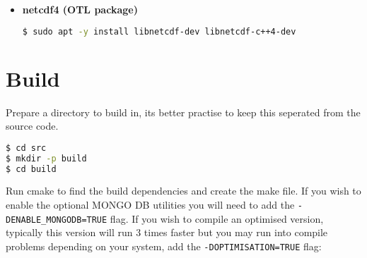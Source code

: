 \begin{itemize}
\begin{lstlisting}[language=bash]
$ cd mongo-c-driver-1.17.1/
$ mkdir cmakebuild
$ cd cmakebuild/
$ cmake -DENABLE_AUTOMATIC_INIT_AND_CLEANUP=OFF ..
$ cmake --build .
$ sudo cmake --build . --target install

$ cd ../../
$ curl -OL https://github.com/mongodb/mongo-cxx-driver/releases/download/r3.6.0/mongo-cxx-driver-r3.6.0.tar.gz
$ tar -xzf mongo-cxx-driver-r3.6.0.tar.gz

$ cd mongo-cxx-driver-r3.6.0/

$ cd build/
$ cmake -DCMAKE_BUILD_TYPE=Release -DCMAKE_INSTALL_PREFIX=/usr/local ..
$ sudo cmake --build . --target EP_mnmlstc_core
$ cmake --build .
$ sudo cmake --build . --target install

$ wget -qO - https://www.mongodb.org/static/pgp/server-4.4.asc | sudo apt-key add -
$ echo "deb [ arch=amd64,arm64 ] https://repo.mongodb.org/apt/ubuntu focal/mongodb-org/4.4 multiverse" | sudo tee /etc/apt/sources.list.d/mongodb-org-4.4.list
$ echo "deb [ arch=amd64,arm64 ] https://repo.mongodb.org/apt/ubuntu bionic/mongodb-org/4.4 multiverse" | sudo tee /etc/apt/sources.list.d/mongodb-org-4.4.list

$ sudo apt update
$ sudo apt install mongodb-org 

$ sudo systemctl start mongod
$ sudo systemctl status mongod
$ mongod
\end{lstlisting}

\item\textbf{netcdf4 (OTL package)}

\begin{lstlisting}[language=bash]
$ sudo apt -y install libnetcdf-dev libnetcdf-c++4-dev
\end{lstlisting}

\end{itemize}

\section{Build}\label{build}

Prepare a directory to build in, its better practise to keep this
seperated from the source code.

\begin{lstlisting}[language=bash]
$ cd src
$ mkdir -p build
$ cd build
\end{lstlisting}

Run cmake to find the build dependencies and create the make file. If
you wish to enable the optional MONGO DB utilities you will need to add
the \texttt{-DENABLE\_MONGODB=TRUE} flag. If you wish to compile an
optimised version, typically this version will run 3 times faster but
you may run into compile problems depending on your system, add the
\texttt{-DOPTIMISATION=TRUE} flag:

